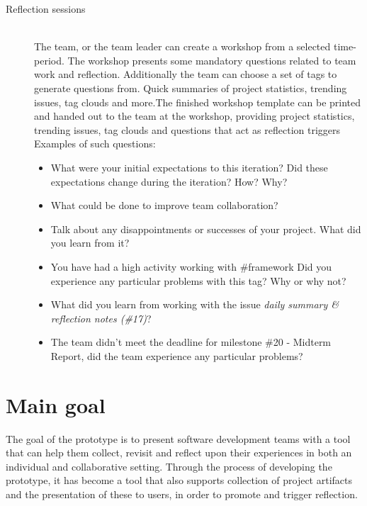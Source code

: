 \begin{description}
	\item[Reflection sessions] \hfill \\
	The team, or the team leader can create a workshop from a selected time-period. The workshop presents some mandatory questions
	related to team work and reflection. Additionally the team can choose a set of tags to generate questions from. Quick summaries of project statistics, trending issues, tag clouds and more.The finished workshop template can be printed and
	handed out to the team at the workshop, providing project statistics, trending issues, tag clouds and questions that act as reflection triggers\\
	Examples of such questions: 
		\begin{itemize}
			\item What were your initial expectations to this iteration? Did these expectations change during the iteration? How? Why?
			\item What could be done to improve team collaboration?
			\item Talk about any disappointments or successes of your project. What did you learn from it?
			\item You have had a high activity working with \#framework Did you experience any particular problems with this tag? Why or why not?
			\item What did you learn from working with the issue \textit{daily summary \& reflection notes (\#17)}?
			\item The team didn't meet the deadline for milestone \#20 - Midterm Report, did the team experience any particular problems?
		\end{itemize}
\end{description}

\section{Main goal}
The goal of the prototype is to present software development teams with a tool that can help them collect, revisit and reflect upon their experiences in both an individual and collaborative setting. Through the process of developing the prototype, it has become a tool that also supports collection of project artifacts and the presentation of these to users, in order to promote and trigger reflection. 